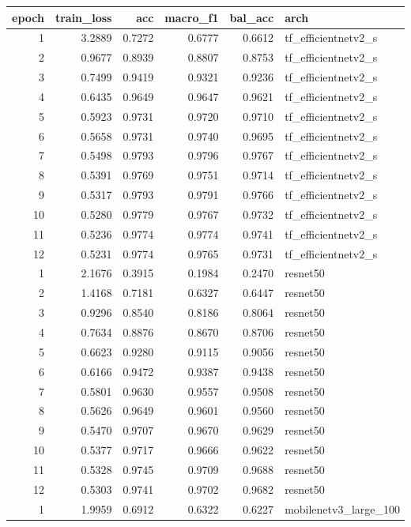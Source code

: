 \begin{tabular}{rrrrrl}
\toprule
epoch & train\_loss & acc & macro\_f1 & bal\_acc & arch \\
\midrule
1 & 3.2889 & 0.7272 & 0.6777 & 0.6612 & tf\_efficientnetv2\_s \\
2 & 0.9677 & 0.8939 & 0.8807 & 0.8753 & tf\_efficientnetv2\_s \\
3 & 0.7499 & 0.9419 & 0.9321 & 0.9236 & tf\_efficientnetv2\_s \\
4 & 0.6435 & 0.9649 & 0.9647 & 0.9621 & tf\_efficientnetv2\_s \\
5 & 0.5923 & 0.9731 & 0.9720 & 0.9710 & tf\_efficientnetv2\_s \\
6 & 0.5658 & 0.9731 & 0.9740 & 0.9695 & tf\_efficientnetv2\_s \\
7 & 0.5498 & 0.9793 & 0.9796 & 0.9767 & tf\_efficientnetv2\_s \\
8 & 0.5391 & 0.9769 & 0.9751 & 0.9714 & tf\_efficientnetv2\_s \\
9 & 0.5317 & 0.9793 & 0.9791 & 0.9766 & tf\_efficientnetv2\_s \\
10 & 0.5280 & 0.9779 & 0.9767 & 0.9732 & tf\_efficientnetv2\_s \\
11 & 0.5236 & 0.9774 & 0.9774 & 0.9741 & tf\_efficientnetv2\_s \\
12 & 0.5231 & 0.9774 & 0.9765 & 0.9731 & tf\_efficientnetv2\_s \\
1 & 2.1676 & 0.3915 & 0.1984 & 0.2470 & resnet50 \\
2 & 1.4168 & 0.7181 & 0.6327 & 0.6447 & resnet50 \\
3 & 0.9296 & 0.8540 & 0.8186 & 0.8064 & resnet50 \\
4 & 0.7634 & 0.8876 & 0.8670 & 0.8706 & resnet50 \\
5 & 0.6623 & 0.9280 & 0.9115 & 0.9056 & resnet50 \\
6 & 0.6166 & 0.9472 & 0.9387 & 0.9438 & resnet50 \\
7 & 0.5801 & 0.9630 & 0.9557 & 0.9508 & resnet50 \\
8 & 0.5626 & 0.9649 & 0.9601 & 0.9560 & resnet50 \\
9 & 0.5470 & 0.9707 & 0.9670 & 0.9629 & resnet50 \\
10 & 0.5377 & 0.9717 & 0.9666 & 0.9622 & resnet50 \\
11 & 0.5328 & 0.9745 & 0.9709 & 0.9688 & resnet50 \\
12 & 0.5303 & 0.9741 & 0.9702 & 0.9682 & resnet50 \\
1 & 1.9959 & 0.6912 & 0.6322 & 0.6227 & mobilenetv3\_large\_100 \\

\end{tabular}
